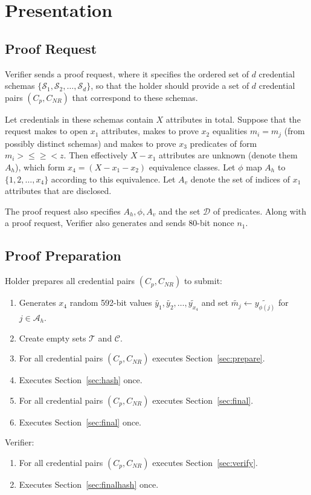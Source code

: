 \documentclass[a4paper]{article}
\begin{document}
\section{Presentation}

\subsection{Proof Request}

Verifier sends a proof request, where it specifies the ordered set of $d$ credential schemas
$\{\mathcal{S}_1,\mathcal{S}_2,\ldots,\mathcal{S}_d\}$, so that the holder should provide a set of $d$ credential pairs $(C_p,C_{NR})$ that correspond to these schemas.

Let credentials in these schemas contain $X$ attributes in total. Suppose that the request makes to open $x_1$ attributes, makes to prove $x_2$ equalities $m_i=m_j$ (from possibly distinct schemas) and makes to prove $x_3$ predicates of form  $m_i >\leq \geq<z$. Then effectively $X-x_1$ attributes are unknown (denote them $A_h$), which form $x_4=(X-x_1-x_2)$ equivalence classes. Let $\phi$ map $A_h$ to $\{1,2,\ldots,x_4\}$ according to this equivalence.  Let $A_v$ denote the set of indices of $x_1$ attributes that are disclosed.

The proof request also specifies $A_h,\phi,A_v$ and the set $\mathcal{D}$ of predicates. Along with a proof request, Verifier also generates and sends 80-bit nonce $n_1$.

\subsection{Proof Preparation}
Holder prepares all credential pairs $(C_p,C_{NR})$ to submit:
\begin{enumerate}
\item Generates $x_4$ random 592-bit values $\widetilde{y_1},\widetilde{y_2},
\ldots,\widetilde{y_{x_4}}$ and set $\widetilde{m_j} \leftarrow \widetilde{y_{\phi(j)}} $ for  $j \in \mathcal{A}_{h}$.
\item
 Create empty sets $\mathcal{T}$ and $\mathcal{C}$.
\item For all credential pairs $(C_p,C_{NR})$ executes Section~\ref{sec:prepare}.
\item Executes Section~\ref{sec:hash} once.
\item For all credential pairs $(C_p,C_{NR})$ executes Section~\ref{sec:final}.
\item Executes Section~\ref{sec:final} once.
\end{enumerate}
Verifier:
\begin{enumerate}
\item For all credential pairs $(C_p,C_{NR})$ executes Section~\ref{sec:verify}.
\item Executes Section~\ref{sec:finalhash} once.
\end{enumerate}
\end{document}
